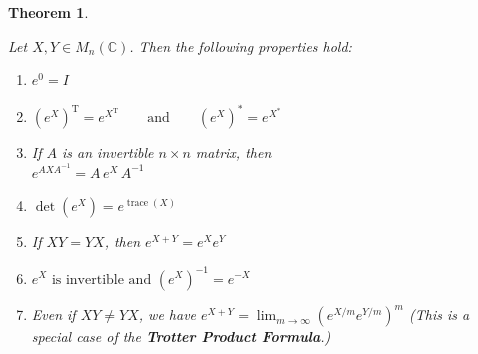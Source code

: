 \documentclass[
]{book}
\providecommand{\tightlist}{%
  \setlength{\itemsep}{0pt}\setlength{\parskip}{0pt}}
\newtheorem{theorem}{Theorem}[chapter]
\theoremstyle{definition}
\theoremstyle{definition}
\theoremstyle{definition}
\theoremstyle{definition}
\theoremstyle{remark}
\begin{document}
\begin{theorem}
\protect\hypertarget{thm:thm1}{}\label{thm:thm1}

Let \(X,Y \in M_n(\mathbb{C})\). Then the following properties hold:

\begin{enumerate}
\def\labelenumi{\arabic{enumi}.}
\tightlist
\item
  \(e^{0} = I\)
\item
  \((e^{X})^{\mathrm{T}} = e^{X^{\mathrm{T}}}\qquad\text{and}\qquad(e^{X})^{*} = e^{X^{*}}\)
\item
  If \(A\) is an invertible \(n \times n\) matrix, then\\
  \(e^{AXA^{-1}} = A\, e^{X}\, A^{-1}\)
\item
  \(\det(e^{X}) = e^{\operatorname{trace}(X)}\)
\item
  If \(XY = YX\), then \(e^{X+Y} = e^{X} e^{Y}\)
\item
  \(e^{X} \text{ is invertible and } (e^{X})^{-1} = e^{-X}\)
\item
  Even if \(XY \neq YX\), we have \(e^{X+Y} = \lim_{m\to\infty} \left(e^{X/m} e^{Y/m}\right)^{m}\) (This is a special case of the \textbf{Trotter Product Formula}.)
\end{enumerate}

\end{theorem}
\end{document}
